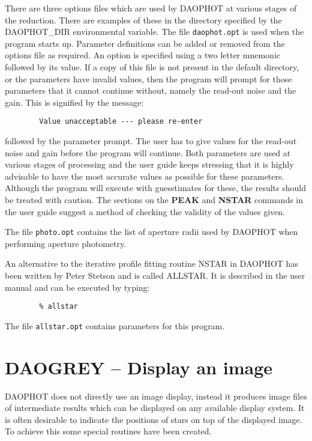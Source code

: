 There are three options files which are used by DAOPHOT at various stages of the
reduction. There are examples of these in the directory specified by the
DAOPHOT\_DIR environmental variable. The file {\tt daophot.opt} is used when the
program starts up. Parameter definitions can be added or removed from the options
file as required. An option is specified using a two letter mnemonic followed by
its value. If a copy of this file is not present in the default directory, or the
parameters have invalid values, then the program will prompt for those parameters
that it cannot continue without, namely the read-out noise and the gain. This is
signified by the message:

\begin{verbatim}
        Value unacceptable --- please re-enter
\end{verbatim}

followed by the parameter prompt. The user has to give values for the read-out
noise and gain before the program will continue. Both parameters are used at
various stages of processing and the user guide keeps stressing that it is highly
advisable to have the most accurate values as possible for these parameters.
Although the program will execute with guesstimates for these, the results should
be treated with caution. The sections on the {\bf PEAK} and {\bf NSTAR} commands in
the user guide suggest a method of checking the validity of the values given. 

The file {\tt photo.opt} contains the list of aperture radii used by DAOPHOT when
performing aperture photometry. 

An alternative to the iterative profile fitting routine NSTAR in DAOPHOT has been
written by Peter Stetson and is called ALLSTAR. It is described in the user manual
and can be executed by typing:

\begin{verbatim}
        % allstar
\end{verbatim}

The file {\tt allstar.opt} contains parameters for this program.

\section{DAOGREY -- Display an image}
\label{sec:daogrey}

DAOPHOT does not directly use an image display, instead it produces image files of
intermediate results which can be displayed on any available display system. It is
often desirable to indicate the positions of stars on top of the displayed image.
To achieve this some special routines have been created. 

